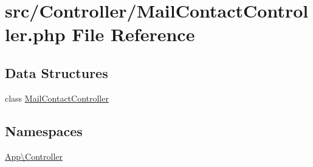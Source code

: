 \hypertarget{_mail_contact_controller_8php}{}\section{src/\+Controller/\+Mail\+Contact\+Controller.php File Reference}
\label{_mail_contact_controller_8php}
\subsection*{Data Structures}
\begin{DoxyCompactItemize}
\item 
class \mbox{\hyperlink{class_app_1_1_controller_1_1_mail_contact_controller}{Mail\+Contact\+Controller}}
\end{DoxyCompactItemize}
\subsection*{Namespaces}
\begin{DoxyCompactItemize}
\item 
 \mbox{\hyperlink{namespace_app_1_1_controller}{App\textbackslash{}\+Controller}}
\end{DoxyCompactItemize}
